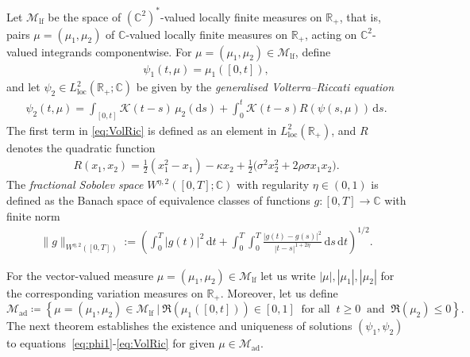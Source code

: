 \documentclass[10pt,a4paper,reqno]{amsart}
\newcommand{\R}{\mathbb{R}}
\newcommand{\C}{\mathbb{C}}
\theoremstyle{plain}
\theoremstyle{definition}
\theoremstyle{remark}
\theoremstyle{example}
\begin{document}
Let $\mathcal{M}_{\mathrm{lf}}$ be the space of $(\C^2)^*$-valued locally finite measures on $\R_+$, that is, pairs $\mu=(\mu_1,\mu_2)$ of $\mathbb{C}$-valued locally finite measures on $\R_+$, acting on $\mathbb{C}^2$-valued integrands componentwise. For $\mu = (\mu_1, \mu_2) \in \mathcal{M}_{\mathrm{lf}}$, define
\begin{align}\label{eq:phi1}
    \psi_1(t, \mu) = \mu_1([0,t]),
\end{align}
and let $\psi_2 \in L_{\mathrm{loc}}^2(\R_+; \C)$ be given by the \emph{generalised Volterra--Riccati equation}
\begin{align}
    \psi_2(t,\mu) = \int_{[0,t]} \mathcal{K}(t-s)\,\mu_2(\mathrm{d}s) + \int_0^t \mathcal{K}(t-s)R(\psi(s,\mu))\,\mathrm{d}s. \label{eq:VolRic}
\end{align}
The first term in \eqref{eq:VolRic} is defined as an element in $L^2_{\mathrm{loc}}(\R_+)$, and $R$ denotes the quadratic function
\begin{align}\label{eq:R}
  R(x_1, x_2) = \tfrac{1}{2}(x_1^2 - x_1) - \kappa x_2 
       + \tfrac{1}{2}\bigl(\sigma^2x_2^2 + 2\rho\sigma x_1x_2\bigr).
\end{align}
The \emph{fractional Sobolev space} $W^{\eta,2}([0,T]; \C)$ with regularity $\eta\in(0,1)$ is defined as the Banach space of equivalence classes of functions $g:[0,T]\to\mathbb{C}$ with finite norm
\begin{align*}
    \|g\|_{W^{\eta,2}([0,T])} :=
    \left(
        \int_0^T |g(t)|^2\,\mathrm{d}t 
        + \int_0^T \int_0^T 
            \frac{|g(t)-g(s)|^2}{|t-s|^{1+2\eta}}\,\mathrm{d}s\,\mathrm{d}t
    \right)^{1/2}.
\end{align*}

For the vector-valued measure $\mu = (\mu_1, \mu_2) \in \mathcal{M}_{\mathrm{lf}}$ let us write $|\mu|, |\mu_1|, |\mu_2|$ for the corresponding variation measures on $\R_+$. Moreover, let us define
\[
    \mathcal{M}_{\mathrm{ad}} \coloneqq \left\{ \mu = (\mu_1, \mu_2) \in \mathcal{M}_{\mathrm{lf}} \ | \ \Re(\mu_1([0,t])) \in [0,1] \ \text{ for all }\ t \geq 0 \ \text{ and } \ \Re(\mu_2)\leq 0 \right\}.
\]
The next theorem establishes the existence and uniqueness of solutions $(\psi_1,\psi_2)$ to equations~\eqref{eq:phi1}-\eqref{eq:VolRic} for given $\mu \in \mathcal{M}_{\mathrm{ad}}$. 
\end{document}
